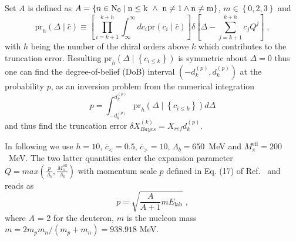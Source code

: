 Set $A$ is defined as 
$A = \left\lbrace n \in \rm{N}_{0} \mid n \leq k~\wedge~n \neq 1 \wedge n \neq m \right\rbrace $, $m \in  \left\lbrace 0, 2, 3 \right\rbrace$ and 
\begin{equation}
\text{pr}_{h}(\Delta\mid\bar{c}) \equiv \left[\prod^{k + h}_{i = k + 1}\int^{\infty}_{\infty}dc_{i}\text{pr}(c_{i}\mid\bar{c}) \right] \delta\left[\Delta - \sum^{k + h}_{j = k + 1}c_{j}Q^{j} \right]\;,
\label{eq_posterior2}
\end{equation}
with $h$ being the number of the chiral orders above $k$ which contributes to the truncation error.
Resulting $\text{pr}_{h}(\Delta\mid \left\lbrace c_{i \leq k} \right\rbrace)$ is symmetric about $\Delta = 0$ thus 
one can find the degree-of-belief (DoB) interval $(-d^{(p)}_{k},d^{(p)}_{k})$  at the probability $p$, 
as an inversion problem from the numerical integration
\begin{equation}
p = \int_{-d^{(p)}_{k}}^{d^{(p)}_{k}} \text{pr}_{h}(\Delta\mid \left\lbrace c_{i \leq k} \right\rbrace) d\Delta
\label{eq_posterior3}
\end{equation}
and thus find the truncation error $\delta X^{(k)}_{Bayes}=X_{ref} d^{(p)}_{k}$.

In following we use $h=10$, $\bar{c}_{<}=0.5$, $\bar{c}_{>}=10$, $\Lambda_{b}=650$~MeV and $M^{\mathrm{eff}}_{\pi}= 200$~MeV.
The two latter quantities enter the expansion parameter
$Q = max\left( \frac{p}{\Lambda_{b}}, \frac{M^{\mathrm{eff}}_{\pi}}{\Lambda_{b}}\right)$ with momentum scale $p$ defined in Eq. (17) of Ref.~\cite{epelbaum2020towards} and reads as
\begin{equation}
p = \sqrt{\frac{A}{A+1}m E_{\mathrm{lab}}}\;,
\end{equation}
where $A$ = 2 for the deuteron, $m$ is the nucleon mass $m = 2m_{p}m_{n}/(m_{p}+m_{n})= 938.918$ MeV. 

